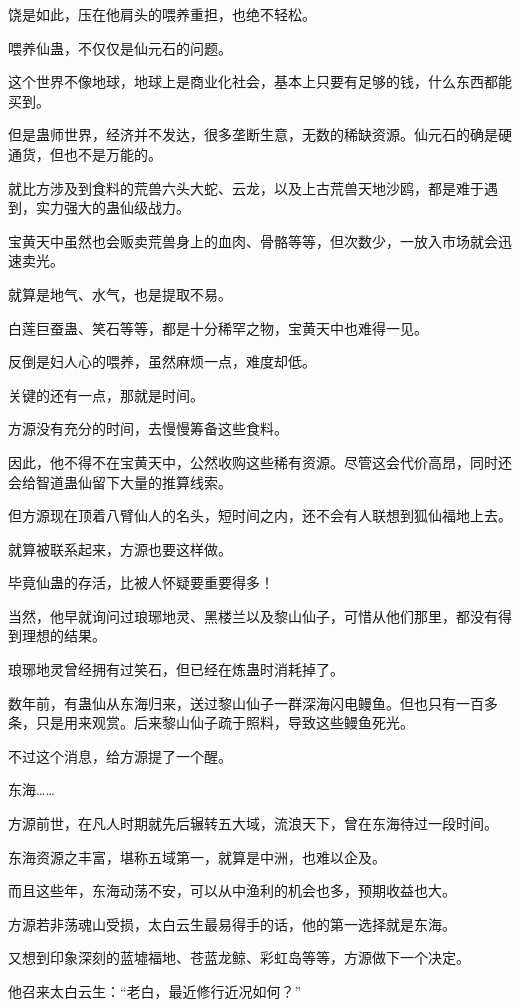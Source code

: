 \begin{this_body}
饶是如此，压在他肩头的喂养重担，也绝不轻松。

喂养仙蛊，不仅仅是仙元石的问题。

这个世界不像地球，地球上是商业化社会，基本上只要有足够的钱，什么东西都能买到。

但是蛊师世界，经济并不发达，很多垄断生意，无数的稀缺资源。仙元石的确是硬通货，但也不是万能的。

就比方涉及到食料的荒兽六头大蛇、云龙，以及上古荒兽天地沙鸥，都是难于遇到，实力强大的蛊仙级战力。

宝黄天中虽然也会贩卖荒兽身上的血肉、骨骼等等，但次数少，一放入市场就会迅速卖光。

就算是地气、水气，也是提取不易。

白莲巨蚕蛊、笑石等等，都是十分稀罕之物，宝黄天中也难得一见。

反倒是妇人心的喂养，虽然麻烦一点，难度却低。

关键的还有一点，那就是时间。

方源没有充分的时间，去慢慢筹备这些食料。

因此，他不得不在宝黄天中，公然收购这些稀有资源。尽管这会代价高昂，同时还会给智道蛊仙留下大量的推算线索。

但方源现在顶着八臂仙人的名头，短时间之内，还不会有人联想到狐仙福地上去。

就算被联系起来，方源也要这样做。

毕竟仙蛊的存活，比被人怀疑要重要得多！

当然，他早就询问过琅琊地灵、黑楼兰以及黎山仙子，可惜从他们那里，都没有得到理想的结果。

琅琊地灵曾经拥有过笑石，但已经在炼蛊时消耗掉了。

数年前，有蛊仙从东海归来，送过黎山仙子一群深海闪电鳗鱼。但也只有一百多条，只是用来观赏。后来黎山仙子疏于照料，导致这些鳗鱼死光。

不过这个消息，给方源提了一个醒。

东海……

方源前世，在凡人时期就先后辗转五大域，流浪天下，曾在东海待过一段时间。

东海资源之丰富，堪称五域第一，就算是中洲，也难以企及。

而且这些年，东海动荡不安，可以从中渔利的机会也多，预期收益也大。

方源若非荡魂山受损，太白云生最易得手的话，他的第一选择就是东海。

又想到印象深刻的蓝墟福地、苍蓝龙鲸、彩虹岛等等，方源做下一个决定。

他召来太白云生：“老白，最近修行近况如何？”


\end{this_body}
